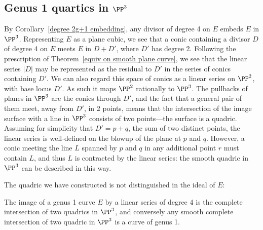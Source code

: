 \subsection{Genus 1 quartics in $\PP^3$} \label{g=1 in P3}

By Corollary~\ref{degree 2g+1 embedding}, any divisor of degree 4 on $E$ embeds $E$ in $\PP^3$. Representing $E$ as a plane cubic, we see that a conic containing a divisor $D$ of degree 4 on $E$ meets $E$ in $D+D'$, where $D'$ has degree 2.
Following the prescription 
of Theorem~\ref{equiv on smooth plane curve}, we see that the linear series $|D|$ may be represented as the residual to
$D'$ in the
series of conics containing $D'$. We can also regard this space of conics as a linear series on $\PP^2$, with base locus $D'$.
As such it maps $\PP^2$ rationally to $\PP^3$. The pullbacks of planes in $\PP^3$ are the conics through $D'$, and the fact that a general pair of them meet,
away from $D'$, in 2 points, means that the intersection of the image surface with a line in $\PP^3$ consists of two points---the surface is a quadric. Assuming for simplicity that $D' = p+q$, the sum of two distinct points, the linear series is well-defined on the blowup of the plane at $p$ and $q$. However, a conic meeting the line $L$ spanned by $p$ and $q$ in any additional point $r$ must contain $L$, and thus $L$ is contracted by the linear series: the smooth quadric in $\PP^3$ can be described in this way.

The quadric we have constructed is not distinguished in the ideal of $E$:

\begin{proposition}\label{elliptic quartic as complete intersection}
 The image of a genus 1 curve $E$ by a linear series of degree 4
 is the complete intersection of two quadrics in $\PP^3$, and conversely any  smooth complete intersection of two quadric
 in $\PP^3$ is a curve of
 genus 1.
\end{proposition}

